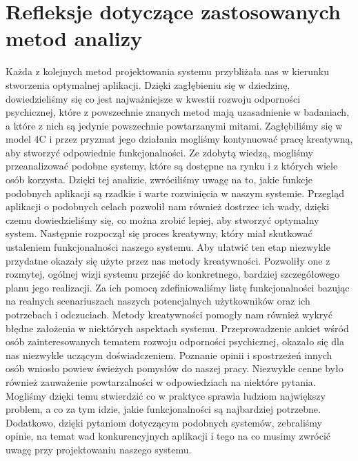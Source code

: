 \section{Refleksje dotyczące zastosowanych metod analizy}
Każda z kolejnych metod projektowania systemu przybliżała nas w kierunku
stworzenia optymalnej aplikacji. Dzięki zagłębieniu się w dziedzinę,
dowiedzieliśmy się co jest najważniejsze w kwestii rozwoju odporności
psychicznej, które z powszechnie znanych metod mają uzasadnienie w badaniach, a
które z nich są jedynie powszechnie powtarzanymi mitami. Zagłębiliśmy się w
model 4C i przez pryzmat jego działania mogliśmy kontynuować pracę kreatywną,
aby stworzyć odpowiednie funkcjonalności. Ze zdobytą wiedzą, mogliśmy
przeanalizować podobne systemy, które są dostępne na rynku i z których wiele
osób korzysta. Dzięki tej analizie, zwróciliśmy uwagę na to, jakie funkcje
podobnych aplikacji są rzadkie i warte rozwinięcia w naszym systemie. Przegląd
aplikacji o podobnych celach pozwolił nam również dostrzec ich wady, dzięki
czemu dowiedzieliśmy się, co można zrobić lepiej, aby stworzyć optymalny system.
Następnie rozpoczął się proces kreatywny, który miał skutkować ustaleniem
funkcjonalności naszego systemu. Aby ułatwić ten etap niezwykle przydatne
okazały się użyte przez nas metody kreatywności. Pozwoliły one z rozmytej,
ogólnej wizji systemu przejść do konkretnego, bardziej szczegółowego planu jego
realizacji. Za ich pomocą zdefiniowaliśmy listę funkcjonalności bazując na
realnych scenariuszach naszych potencjalnych użytkowników oraz ich potrzebach i
odczuciach. Metody kreatywności pomogły nam również wykryć błędne założenia w
niektórych aspektach systemu. Przeprowadzenie ankiet wśród osób zainteresowanych
tematem rozwoju odporności psychicznej, okazało się dla nas niezwykle uczącym
doświadczeniem. Poznanie opinii i spostrzeżeń innych osób wniosło powiew
świeżych pomysłów do naszej pracy. Niezwykle cenne było również zauważenie
powtarzalności w odpowiedziach na niektóre pytania. Mogliśmy dzięki temu
stwierdzić co w praktyce sprawia ludziom największy problem, a co za tym idzie,
jakie funkcjonalności są najbardziej potrzebne. Dodatkowo, dzięki pytaniom
dotyczącym podobnych systemów, zebraliśmy opinie, na temat wad konkurencyjnych
aplikacji i tego na co musimy zwrócić uwagę przy projektowaniu naszego systemu.